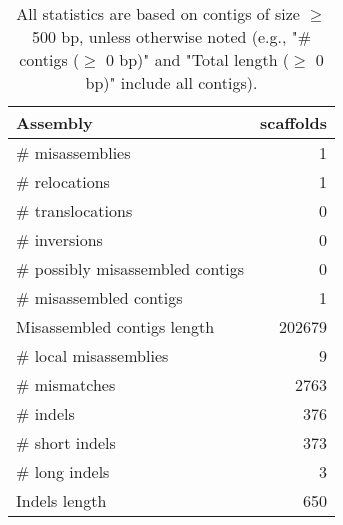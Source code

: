 \documentclass[12pt,a4paper]{article}
\begin{document}
\begin{table}[ht]
\begin{center}
\caption{All statistics are based on contigs of size $\geq$ 500 bp, unless otherwise noted (e.g., "\# contigs ($\geq$ 0 bp)" and "Total length ($\geq$ 0 bp)" include all contigs).}
\begin{tabular}{|l*{1}{|r}|}
\hline
Assembly & scaffolds \\ \hline
\# misassemblies & 1 \\ \hline
\hspace{5mm}\# relocations & 1 \\ \hline
\hspace{5mm}\# translocations & 0 \\ \hline
\hspace{5mm}\# inversions & 0 \\ \hline
\# possibly misassembled contigs & 0 \\ \hline
\# misassembled contigs & 1 \\ \hline
Misassembled contigs length & 202679 \\ \hline
\# local misassemblies & 9 \\ \hline
\# mismatches & 2763 \\ \hline
\# indels & 376 \\ \hline
\hspace{5mm}\# short indels & 373 \\ \hline
\hspace{5mm}\# long indels & 3 \\ \hline
Indels length & 650 \\ \hline
\end{tabular}
\end{center}
\end{table}
\end{document}
